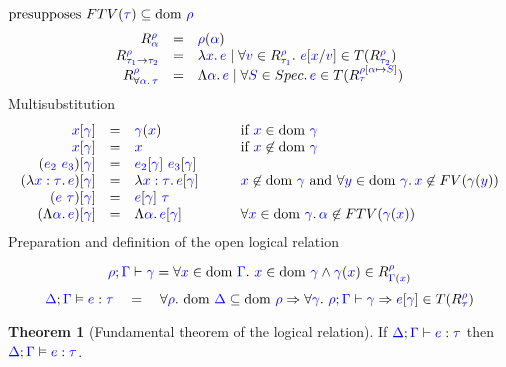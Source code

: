 \documentclass{article}
\theoremstyle{definition}
\newtheorem{theorem}{Theorem}
\newcommand{\meta}[1]{{\color{blue}#1}}
\newcommand{\dom}[1]{\ensuremath{\text{dom}\ #1}}
\begin{document}
  \noindent\boxed{R_{\meta{\tau}}^{\meta{\rho}}} $\text{presupposes }FTV(\meta{\tau}) \subseteq\dom{\meta{\rho}}$
  \[
    \begin{array}{rcl}
      R_{\meta{\alpha}}^{\meta{\rho}} & = & \meta{\rho}(\meta{\alpha})\\
      R_{\meta{\tau_1}\to\meta{\tau_2}}^{\meta{\rho}} & = & \set{\lambda\meta{x}.\,\meta{e} \mid \forall\meta{v}\in R_{\meta{\tau_1}}^{\meta{\rho}}.\ \meta{e}[\meta{x}/\meta{v}]\in T(R_{\meta{\tau_2}}^{\meta{\rho}})}\\
      R_{\forall\meta{\alpha}.\,\meta{\tau}}^{\meta{\rho}} & = & \set{\Lambda\meta{\alpha}.\,\meta{e} \mid \forall\meta{S}\in Spec.\, \meta{e}\in T(R_{\meta{\tau}}^{\meta{\rho}[\meta{\alpha}\mapsto\meta{S}]})}\\
    \end{array}
  \]
  \noindent\boxed{\meta{e}[\meta{\gamma}]}\hfill{}Multisubstitution\hfill{}
  \[
    \begin{array}{rcll}
      \meta{x}[\meta{\gamma}] & = & \meta{\gamma}(\meta{x}) & \qquad\text{if } \meta{x}\in\dom{\meta{\gamma}}\\
      \meta{x}[\meta{\gamma}] & = & \meta{x} & \qquad\text{if } \meta{x}\not\in\dom{\meta{\gamma}}\\

      (\meta{e_2}\ \meta{e_3})[\meta{\gamma}] & = & \meta{e_2}[\meta{\gamma}]\ \meta{e_3}[\meta{\gamma}]&\\
      (\lambda\meta{x}:\meta{\tau}.\,\meta{e})[\meta{\gamma}] & = & \lambda\meta{x}:\meta{\tau}.\,\meta{e}[\meta{\gamma}]& \qquad \meta{x}\not\in\dom{\meta{\gamma}}\text{ and }\forall\meta{y}\in\dom{\meta{\gamma}}.\,\meta{x}\not\in FV(\meta{\gamma}(\meta{y}))\\
      (\meta{e}\ \meta{\tau})[\meta{\gamma}] & = & \meta{e}[\meta{\gamma}]\ \meta{\tau}&\\
      (\Lambda\meta{\alpha}.\,\meta{e})[\meta{\gamma}] & = & \Lambda\meta{\alpha}.\,\meta{e}[\meta{\gamma}]&\qquad
\forall\meta{x}\in\dom{\meta{\gamma}}.\,\meta{\alpha}\not\in FTV(\meta{\gamma}(\meta{x}))
    \end{array}
  \]
  \hfill{}Preparation and definition of the open logical relation\hfill{}

  \noindent\boxed{\meta{\rho};\meta{\Gamma}\vdash\meta{\gamma}}\vspace{-3mm}
  \[
    \meta{\rho};\meta{\Gamma}\vdash\meta{\gamma} =
    \forall\meta{x}\in\dom{\meta{\Gamma}}.\
    \meta{x}\in\dom{\meta{\gamma}} \wedge \meta{\gamma}(\meta{x})\in R_{\meta{\Gamma}(\meta{x})}^{\meta{\rho}}
  \]
  \boxed{\meta{\Delta};\meta{\Gamma}\vDash\meta{e}:\meta{\tau}}\vspace{-3mm}
  \[
    \meta{\Delta};\meta{\Gamma}\vDash\meta{e}:\meta{\tau} \quad=\quad
    \forall\meta{\rho}.\
    \dom{\meta{\Delta}}\subseteq \dom{\meta{\rho}}\Rightarrow
    \forall\meta{\gamma}.\
    \meta{\rho};\meta{\Gamma}\vdash\meta{\gamma}\Rightarrow
    \meta{e}[\meta{\gamma}]\in T(R_{\meta{\tau}}^{\meta{\rho}})
  \]
  \begin{theorem}[Fundamental theorem of the logical relation]
    If $\meta{\Delta};\meta{\Gamma}\vdash\meta{e}:\meta{\tau}$ then
    $\meta{\Delta};\meta{\Gamma}\vDash\meta{e}:\meta{\tau}$.
  \end{theorem}
\end{document}
